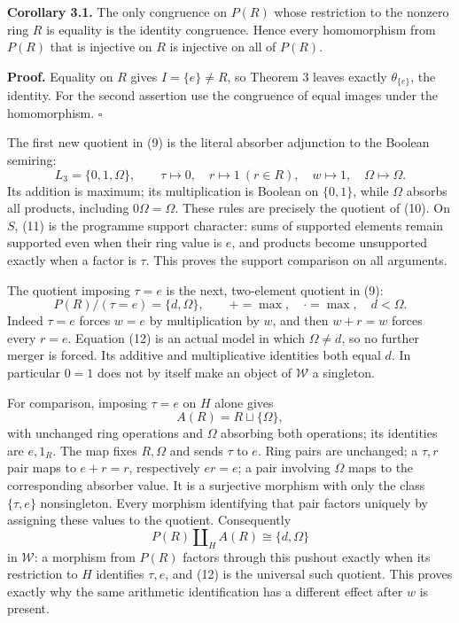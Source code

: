 \documentclass[
]{article}
\begin{document}
\textbf{Corollary 3.1.} The only congruence on \(P(R)\) whose
restriction to the nonzero ring \(R\) is equality is the identity
congruence. Hence every homomorphism from \(P(R)\) that is injective on
\(R\) is injective on all of \(P(R)\).

\textbf{Proof.} Equality on \(R\) gives \(I=\{e\}\ne R\), so Theorem 3
leaves exactly \(\theta_{\{e\}}\), the identity. For the second
assertion use the congruence of equal images under the homomorphism.
\(\square\)

The first new quotient in (9) is the literal absorber adjunction to the
Boolean semiring: \[
L_3=\{0,1,\Omega\},\qquad
\tau\mapsto0,\quad r\mapsto1\ (r\in R),\quad w\mapsto1,\quad\Omega\mapsto\Omega.
\tag{11}
\] Its addition is maximum; its multiplication is Boolean on
\(\{0,1\}\), while \(\Omega\) absorbs all products, including
\(0\Omega=\Omega\). These rules are precisely the quotient of (10). On
\(S\), (11) is the programme support character: sums of supported
elements remain supported even when their ring value is \(e\), and
products become unsupported exactly when a factor is \(\tau\). This
proves the support comparison on all arguments.

The quotient imposing \(\tau=e\) is the next, two-element quotient in
(9): \[
P(R)/(\tau=e)=\{d,\Omega\},\qquad +=\max,\quad\cdot=\max,\quad d<\Omega.
\tag{12}
\] Indeed \(\tau=e\) forces \(w=e\) by multiplication by \(w\), and then
\(w+r=w\) forces every \(r=e\). Equation (12) is an actual model in
which \(\Omega\ne d\), so no further merger is forced. Its additive and
multiplicative identities both equal \(d\). In particular \(0=1\) does
not by itself make an object of \(\mathcal W\) a singleton.

For comparison, imposing \(\tau=e\) on \(H\) alone gives \[
A(R)=R\sqcup\{\Omega\},
\] with unchanged ring operations and \(\Omega\) absorbing both
operations; its identities are \(e,1_R\). The map fixes \(R,\Omega\) and
sends \(\tau\) to \(e\). Ring pairs are unchanged; a \(\tau,r\) pair
maps to \(e+r=r\), respectively \(er=e\); a pair involving \(\Omega\)
maps to the corresponding absorber value. It is a surjective morphism
with only the class \(\{\tau,e\}\) nonsingleton. Every morphism
identifying that pair factors uniquely by assigning these values to the
quotient. Consequently \[
P(R)\amalg_H A(R)\cong\{d,\Omega\}
\tag{13}
\] in \(\mathcal W\): a morphism from \(P(R)\) factors through this
pushout exactly when its restriction to \(H\) identifies \(\tau,e\), and
(12) is the universal such quotient. This proves exactly why the same
arithmetic identification has a different effect after \(w\) is present.
\end{document}
